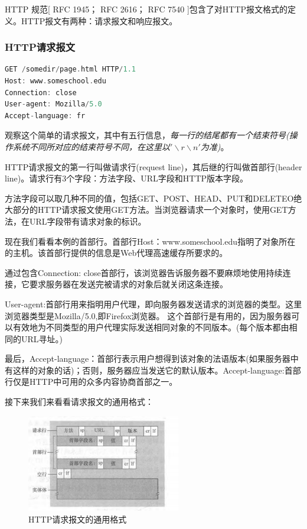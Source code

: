HTTP 规范[ RFC 1945； RFC 2616； RFC 7540 ]包含了对HTTP报文格式的定义。HTTP报文有两种：请求报文和响应报文。

\subsubsection{HTTP请求报文}

\begin{lstlisting}[language=C++]
GET /somedir/page.html HTTP/1.1
Host: www.someschool.edu
Connection: close
User-agent: Mozilla/5.0
Accept-language: fr
\end{lstlisting}

    观察这个简单的请求报文，其中有五行信息，\emph{每一行的结尾都有一个结束符号(操作系统不同所对应的结束符号不同，在这里以$'\backslash{r}\backslash{n}'$为准)}。

    HTTP请求报文的第一行叫做请求行(request line)，其后继的行叫做首部行(header line)。请求行有3个字段：方法字段、URL字段和HTTP版本字段。

    方法字段可以取几种不同的值，包括GET、POST、HEAD、PUT和DELETEO绝大部分的HTTP请求报文使用GET方法。当浏览器请求一个对象时，使用GET方法，在URL字段带有请求对象的标识。

    现在我们看看本例的首部行。首部行Host：www.someschool.edu指明了对象所在的主机。该首部行提供的信息是Web代理高速缓存所要求的。

    通过包含Connection: close首部行，该浏览器告诉服务器不要麻烦地使用持续连接，它要求服务器在发送完被请求的对象后就关闭这条连接。
    
    User-agent:首部行用来指明用户代理，即向服务器发送请求的浏览器的类型。这里浏览器类型是Mozilla/5.0,即Firefox浏览器。 这个首部行是有用的，因为服务器可以有效地为不同类型的用户代理实际发送相同对象的不同版本。(每个版本都由相同的URL寻址。)
    
    最后，Accept-language：首部行表示用户想得到该对象的法语版本(如果服务器中有这样的对象的话)；否则，服务器应当发送它的默认版本。Accept-language:首部行仅是HTTP中可用的众多内容协商首部之一。

    接下来我们来看看请求报文的通用格式：

\begin{figure}[!htbp]
    \centering
    \includegraphics[width=0.6\textwidth]{image/chapter02/请求报文通用格式.png}
    \caption{HTTP请求报文的通用格式}
\end{figure}

